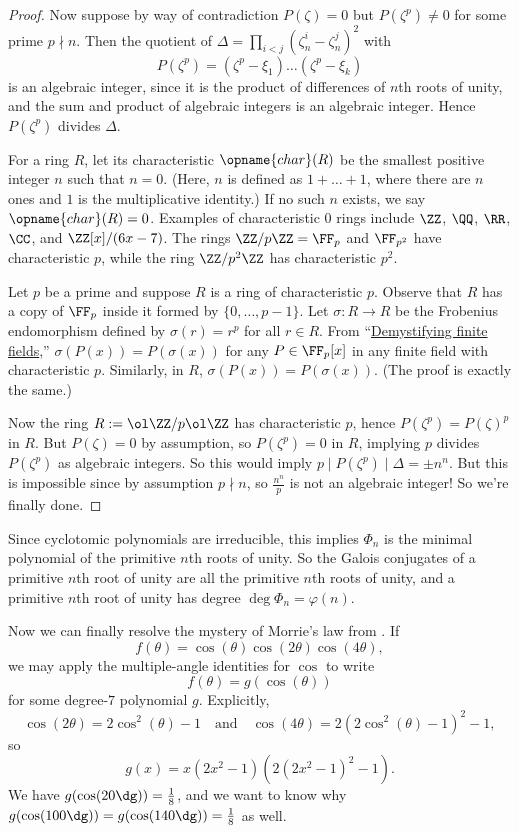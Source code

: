 \documentclass[11pt]{scrartcl}
\begin{document}
\begin{proof}
Now suppose by way of contradiction $P(\zeta) = 0$ but $P(\zeta^p) \neq 0$ for some prime $p \nmid n$. Then the quotient of $\Delta = \prod_{i < j}(\zeta_n^i - \zeta_n^j)^2$ with
\[P(\zeta^p) = (\zeta^p - \xi_1) \dots (\zeta^p - \xi_k)\]
is an algebraic integer, since it is the product of differences of $n$th roots of unity, and the sum and product of algebraic integers is an algebraic integer. Hence $P(\zeta^p)$ divides $\Delta$.

For a ring $R$, let its characteristic $\opname{char}(R)$ be the smallest positive integer $n$ such that $n = 0$. (Here, $n$ is defined as $1 + \dots + 1$, where there are $n$ ones and $1$ is the multiplicative identity.) If no such $n$ exists, we say $\opname{char}(R) = 0$. Examples of characteristic $0$ rings include $\ZZ$, $\QQ$, $\RR$, $\CC$, and $\ZZ[x]/(6x - 7)$. The rings $\ZZ/p\ZZ = \FF_p$ and $\FF_{p^2}$ have characteristic $p$, while the ring $\ZZ/p^2\ZZ$ has characteristic $p^2$.

Let $p$ be a prime and suppose $R$ is a ring of characteristic $p$. Observe that $R$ has a copy of $\FF_p$ inside it formed by $\{0,\dots,p - 1\}$. Let $\sigma: R \to R$ be the Frobenius endomorphism defined by $\sigma(r) = r^p$ for all $r \in R$. From ``\href{https://knowingant.github.io/handouts/finite-fields/finite-fields.pdf}{Demystifying finite fields},'' $\sigma(P(x)) = P(\sigma(x))$ for any $P \in \FF_p[x]$ in any finite field with characteristic $p$. Similarly, in $R$, $\sigma(P(x)) = P(\sigma(x))$. (The proof is exactly the same.)

Now the ring $R := \ol\ZZ/p\ol\ZZ$ has characteristic $p$, hence $P(\zeta^p) = P(\zeta)^p$ in $R$. But $P(\zeta) = 0$ by assumption, so $P(\zeta^p) = 0$ in $R$, implying $p$ divides $P(\zeta^p)$ as algebraic integers. So this would imply $p \mid P(\zeta^p) \mid \Delta = \pm n^n$. But this is impossible since by assumption $p \nmid n$, so $\frac{n^n}p$ is not an algebraic integer! So we're finally done.
\end{proof}

Since cyclotomic polynomials are irreducible, this implies $\Phi_n$ is the minimal polynomial of the primitive $n$th roots of unity. So the Galois conjugates of a primitive $n$th root of unity are all the primitive $n$th roots of unity, and a primitive $n$th root of unity has degree $\deg \Phi_n = \varphi(n)$.

Now we can finally resolve the mystery of Morrie's law from .
If
\[f(\theta) = \cos(\theta)\cos(2\theta)\cos(4\theta),\]
we may apply the multiple-angle identities for $\cos$ to write
\[f(\theta) = g(\cos(\theta))\]
for some degree-$7$ polynomial $g$. Explicitly,
\[\cos(2\theta) = 2\cos^2(\theta) - 1 \quad \text{and} \quad \cos(4\theta) = 2(2\cos^2(\theta) - 1)^2 - 1,\]
so
\[g(x) = x(2x^2 - 1)(2(2x^2 - 1)^2 - 1).\]
We have $g(\cos(20\dg)) = \frac18$, and we want to know why $g(\cos(100\dg)) = g(\cos(140\dg)) = \frac18$ as well.
\end{document}
